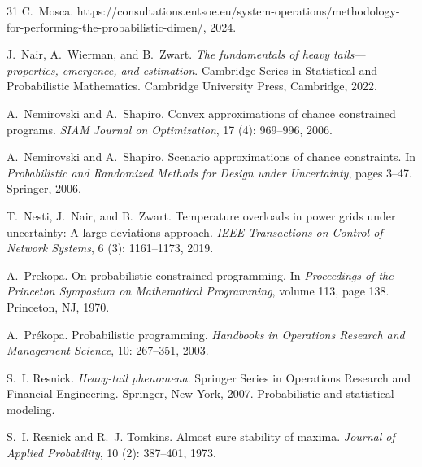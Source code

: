 \documentclass[a4paper, a4wide, 10pt, reqno]{amsart}
\theoremstyle{plain}
\begin{document}
\begin{thebibliography}{31}
C.~Mosca.
\newblock https://consultations.entsoe.eu/system-operations/methodology-for-performing-the-probabilistic-dimen/, 2024.

J.~Nair, A.~Wierman, and B.~Zwart.
\newblock \emph{The fundamentals of heavy tails---properties, emergence, and estimation}.
\newblock Cambridge Series in Statistical and Probabilistic Mathematics. Cambridge University Press, Cambridge, 2022.

A.~Nemirovski and A.~Shapiro.
\newblock Convex approximations of chance constrained programs.
\newblock \emph{SIAM Journal on Optimization}, 17 (4): 969--996, 2006{}.

A.~Nemirovski and A.~Shapiro.
\newblock Scenario approximations of chance constraints.
\newblock In \emph{Probabilistic and Randomized Methods for Design under Uncertainty}, pages 3--47. Springer, 2006{}.

T.~Nesti, J.~Nair, and B.~Zwart.
\newblock Temperature overloads in power grids under uncertainty: A large deviations approach.
\newblock \emph{IEEE Transactions on Control of Network Systems}, 6 (3): 1161--1173, 2019.

A.~Prekopa.
\newblock On probabilistic constrained programming.
\newblock In \emph{Proceedings of the Princeton Symposium on Mathematical Programming}, volume 113, page 138. Princeton, NJ, 1970.

A.~Pr{\'e}kopa.
\newblock Probabilistic programming.
\newblock \emph{Handbooks in Operations Research and Management Science}, 10: 267--351, 2003.

S.~I. Resnick.
\newblock \emph{Heavy-tail phenomena}.
\newblock Springer Series in Operations Research and Financial Engineering. Springer, New York, 2007.
\newblock Probabilistic and statistical modeling.

S.~I. Resnick and R.~J. Tomkins.
\newblock Almost sure stability of maxima.
\newblock \emph{Journal of Applied Probability}, 10 (2): 387--401, 1973.




\end{thebibliography}
\end{document}
